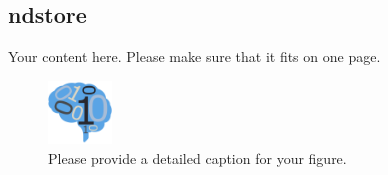 \documentclass[simplex.tex]{subfiles}
\begin{document}
\subsection{ndstore}


Your content here. Please make sure that it fits on one page.

\begin{figure}[!h]
\begin{cframed}
\centering
\includegraphics[width=0.15\textwidth]{neurodata_small.png}
\caption{Please provide a detailed caption for your figure.}
\label{fig:name}
\end{cframed}
\end{figure}
\end{document}
